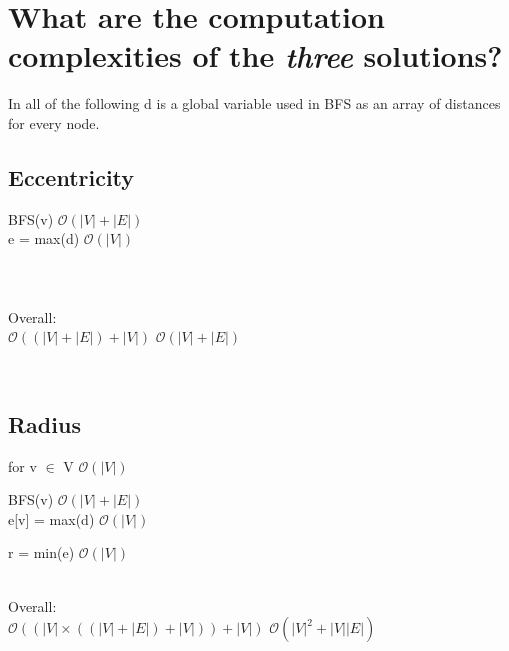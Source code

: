 \documentclass[]{article}
\begin{document}
    \clearpage

  \section{What are the computation complexities of the \emph{three} solutions?}

    In all of the following d is a global variable used in BFS as an array of distances for every node.

  \begin{minipage}[t]{0.33\linewidth}
    \subsection{Eccentricity}
      \begin{adjustwidth}{2em}{0pt}
          BFS(v) \hfill $\mathcal{O} \left( |V| + |E| \right)$\\
          e = max(d) \hfill $\mathcal{O} \left( |V| \right)$\\
        \ \\
        \ \\
        \ \\
        Overall: \\

        $ \mathcal{O} \left( \left( |V| + |E| \right) + |V| \right)$
        $ \mathcal{O} \left( |V| + |E| \right)$
      \end{adjustwidth}
  \end{minipage}
\
  \begin{minipage}[t]{0.33\linewidth}
    \subsection{Radius}
      \begin{adjustwidth}{2em}{0pt}
      for v $\in$ V \hfill $\mathcal{O} \left( |V| \right)$
      \begin{adjustwidth}{1em}{0pt}
        BFS(v) \hfill $\mathcal{O} \left( |V| + |E| \right)$\\
        e[v] = max(d) \hfill $\mathcal{O} \left( |V| \right)$
        \end{adjustwidth}
        r = min(e) \hfill $\mathcal{O} \left( |V| \right)$

      \ \\
      Overall: \\

      $ \mathcal{O} \left( \left(|V| \times \left( \left( |V| + |E| \right) + |V| \right) \right) + |V| \right)$
      $ \mathcal{O} \left( |V|^2 + |V||E| \right)$
    \end{adjustwidth}
  \end{minipage}
\end{document}
